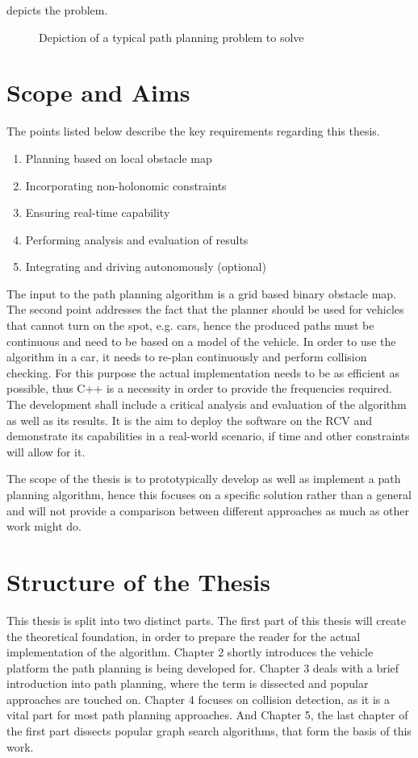  depicts the problem.

\begin{figure}[h]
\caption{Depiction of a typical path planning problem to solve}
\label{fig:problemDepiction}
\end{figure}


\section{Scope and Aims}
The points listed below describe the key requirements regarding this thesis.

\begin{enumerate}
    \item Planning based on local obstacle map
    \item Incorporating non-holonomic constraints
    \item Ensuring real-time capability
    \item Performing analysis and evaluation of results
    \item Integrating and driving autonomously (optional)
\end{enumerate}

The input to the path planning algorithm is a grid based binary obstacle map. The second point addresses the fact that the planner should be used for vehicles that cannot turn on the spot, e.g. cars, hence the produced paths must be continuous and need to be based on a model of the vehicle. In order to use the algorithm in a car, it needs to re-plan continuously and perform collision checking. For this purpose the actual implementation needs to be as efficient as possible, thus C++ is a necessity in order to provide the frequencies required. The development shall include a critical analysis and evaluation of the algorithm as well as its results. It is the aim to deploy the software on the RCV and demonstrate its capabilities in a real-world scenario, if time and other constraints will allow for it.

The scope of the thesis is to prototypically develop as well as implement a path planning algorithm, hence this focuses on a specific solution rather than a general and will not provide a comparison between different approaches as much as other work might do.

\section{Structure of the Thesis}
This thesis is split into two distinct parts. The first part of this thesis will create the theoretical foundation, in order to prepare the reader for the actual implementation of the algorithm. Chapter 2 shortly introduces the vehicle platform the path planning is being developed for. Chapter 3 deals with a brief introduction into path planning, where the term is dissected and popular approaches are touched on. Chapter 4 focuses on collision detection, as it is a vital part for most path planning approaches. And Chapter 5, the last chapter of the first part dissects popular graph search algorithms, that form the basis of this work.

